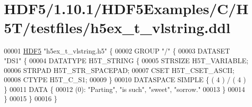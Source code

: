 \hypertarget{_h_d_f5_21_810_81_2_h_d_f5_examples_2_c_2_h5_t_2testfiles_2h5ex__t__vlstring_8ddl_source}{}\section{H\+D\+F5/1.10.1/\+H\+D\+F5\+Examples/\+C/\+H5\+T/testfiles/h5ex\+\_\+t\+\_\+vlstring.ddl}
\label{_h_d_f5_21_810_81_2_h_d_f5_examples_2_c_2_h5_t_2testfiles_2h5ex__t__vlstring_8ddl_source}

\begin{DoxyCode}
00001 \hyperlink{namespace_h_d_f5}{HDF5} \textcolor{stringliteral}{"h5ex\_t\_vlstring.h5"} \{
00002 GROUP \textcolor{stringliteral}{"/"} \{
00003    DATASET \textcolor{stringliteral}{"DS1"} \{
00004       DATATYPE  H5T\_STRING \{
00005          STRSIZE H5T\_VARIABLE;
00006          STRPAD H5T\_STR\_SPACEPAD;
00007          CSET H5T\_CSET\_ASCII;
00008          CTYPE H5T\_C\_S1;
00009       \}
00010       DATASPACE  SIMPLE \{ ( 4 ) / ( 4 ) \}
00011       DATA \{
00012       (0): \textcolor{stringliteral}{"Parting"}, \textcolor{stringliteral}{"is such"}, \textcolor{stringliteral}{"sweet"}, \textcolor{stringliteral}{"sorrow."}
00013       \}
00014    \}
00015 \}
00016 \}
\end{DoxyCode}
